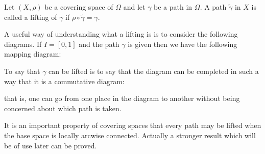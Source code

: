 Let $(X, \rho)$ be a covering space of $\Omega$ and let $\gamma$ be a path in $\Omega$. A path $\tilde{\gamma}$ in $X$ is called a lifting of $\gamma$ if $\rho \circ \tilde{\gamma} = \gamma$.

A useful way of understanding what a lifting is is to consider the following diagrams. If $I = [0, 1]$ and the path $\gamma$ is given then we have the following mapping diagram:

To say that $\gamma$ can be lifted is to say that the diagram can be completed in such a way that it is a commutative diagram:

that is, one can go from one place in the diagram to another without being concerned about which path is taken.

It is an important property of covering spaces that every path may be lifted when the base space is locally arcwise connected. Actually a stronger result which will be of use later can be proved.